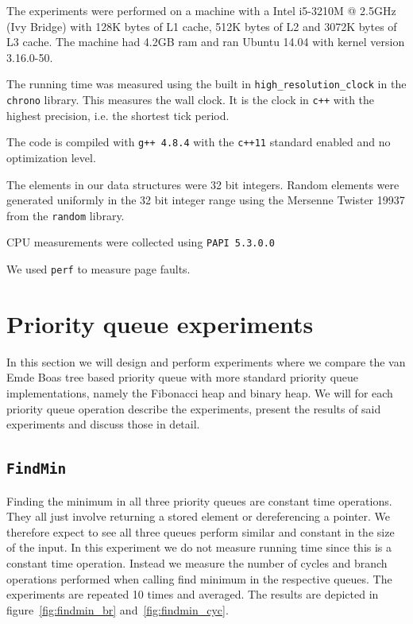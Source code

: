 \documentclass[a4paper,oneside,article,11pt]{memoir}
\begin{document}
The experiments were performed on a machine with a Intel i5-3210M @ 2.5GHz (Ivy Bridge) with 128K bytes of L1 cache, 512K bytes of L2 and 3072K bytes of L3 cache. The machine had 4.2GB ram and ran Ubuntu 14.04 with kernel version 3.16.0-50.

The running time was measured using the built in \texttt{high\_resolution\_clock} in the \texttt{chrono} library. This measures the wall clock. It is the clock in \texttt{c++} with the highest precision, i.e. the shortest tick period.

The code is compiled with \texttt{g++ 4.8.4} with the \texttt{c++11} standard enabled and no optimization level.

The elements in our data structures were 32 bit integers. Random elements were generated uniformly in the 32 bit integer range using the Mersenne Twister 19937 from the \texttt{random} library.

CPU measurements were collected using \texttt{PAPI 5.3.0.0}

We used \texttt{perf} to measure page faults.

\chapter{Priority queue experiments}
\label{heap_experiments}
In this section we will design and perform experiments where we compare the van Emde Boas tree based priority queue with more standard priority queue implementations, namely the Fibonacci heap and binary heap. We will for each priority queue operation describe the experiments, present the results of said experiments and discuss those in detail.

\section{\texttt{FindMin}}
Finding the minimum in all three priority queues are constant time operations. They all just involve returning a stored element or dereferencing a pointer. We therefore expect to see all three queues perform similar and constant in the size of the input. In this experiment we do not measure running time since this is a constant time operation. Instead we measure the number of cycles and branch operations performed when calling find minimum in the respective queues. The experiments are repeated 10 times and averaged. The results are depicted in figure~\ref{fig:findmin_br} and~\ref{fig:findmin_cyc}.
\end{document}

